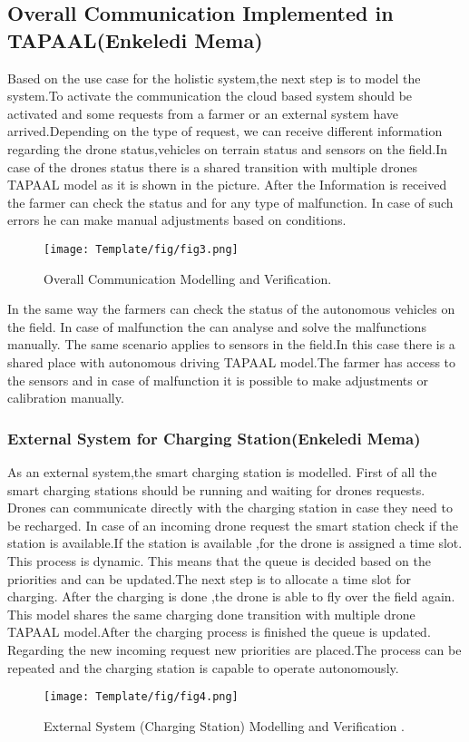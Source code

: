 \documentclass[english]{lni}
\begin{document}
\subsection{Overall Communication Implemented in TAPAAL(Enkeledi Mema)}

Based on the use case for the holistic system,the next step is to model the system.To activate the communication the cloud based system should be activated and some requests from a farmer or an external system have arrived.Depending on the type of request, we can receive  different information regarding the drone status,vehicles on terrain status and sensors on the field.In case of the drones status there is a shared transition with multiple drones TAPAAL model as it is shown in the picture. After the Information is received the farmer can check the status and for any type of malfunction. In case of such errors he can make manual adjustments based on conditions.
\begin{figure}[h]
    \texttt{[image: Template/fig/fig3.png]}
    \centering
    \caption{ Overall Communication Modelling and Verification. }
\end{figure}
In the same way the farmers can check the status of the autonomous vehicles on the field. In case of malfunction the can analyse and solve the malfunctions manually. The same scenario applies to sensors in the field.In this case there is a shared place with autonomous driving TAPAAL model.The farmer has access to the sensors and in case of malfunction it is possible to make adjustments or calibration manually. 

\subsubsection{External System for Charging Station(Enkeledi Mema) }
As an external system,the smart charging station is modelled. First of all the smart charging stations should be running and waiting for drones requests. Drones can communicate directly with the charging station in case they need to be recharged. In case of an incoming drone request the smart station check if the station is available.If the station is available ,for the drone is assigned a time slot. This process is dynamic. This means that the queue is decided based on the priorities and can be updated.The next step is to allocate a time slot for charging. After the charging is done ,the drone is able to fly over the field again. This model shares the same charging done transition with multiple drone TAPAAL model.After the charging process is finished the queue is updated. Regarding the new incoming request new priorities are placed.The process can be repeated and the charging station is capable to operate autonomously. 
\begin{figure}[h]
    \texttt{[image: Template/fig/fig4.png]}
    \centering
    \caption{ External System (Charging Station) Modelling and Verification .}
\end{figure}
\end{document}
